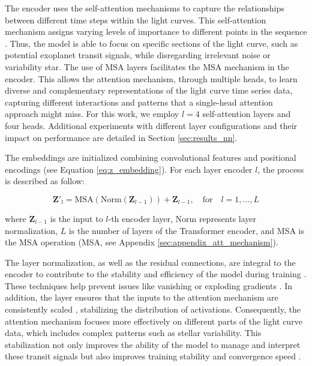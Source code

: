 The encoder uses the self-attention mechanisms to capture the relationships between different time steps within the light curves. This self-attention mechanism assigns varying levels of importance to different points in the sequence \citep{vaswani2017attention}. Thus, the model is able to focus on specific sections of the light curve, such as potential exoplanet transit signals, while disregarding irrelevant noise or variability star. The use of MSA layers facilitates the MSA mechanism in the encoder. This allows the attention mechanism, through multiple heads, to learn diverse and complementary representations of the light curve time series data, capturing different interactions and patterns that a single-head attention approach might miss. For this work, we employ $l=4$ self-attention layers and four heads. Additional experiments with different layer configurations and their impact on performance are detailed in Section \ref{sec:results_nn}.\par

The embeddings are initialized combining convolutional features and positional encodings (see Equation \ref{eq:z_embedding}). For each layer encoder $l$, the process is described as follow:

\begin{equation}
\mathbf{Z'}_{l} = \mathrm{MSA}({\mathrm{Norm}(\mathbf{Z}_{l-1})}) + {\mathbf{Z}_{l-1}}, \quad \mathrm{for} \quad l=1,..., L
\end{equation}

where $\mathbf{Z}_{l-1}$ is the input to $l$-th encoder layer, $\mathrm{Norm}$ represents layer normalization, $L$ is the number of layers of the Transformer encoder, and MSA is the MSA operation (MSA, see Appendix \ref{sec:appendix_att_mechanism}). \par


The layer normalization, as well as the residual connections, are integral to the encoder to contribute to the stability and efficiency of the model during training \citep{wang2019learning}. These techniques help prevent issues like vanishing or exploding gradients \citep{ba2016using}. In addition, the layer ensures that the inputs to the attention mechanism are consistently scaled \citep{dosovitskiy2020image}, stabilizing the distribution of activations. Consequently, the attention mechanism focuses more effectively on different parts of the light curve data, which includes complex patterns such as stellar variability. This stabilization not only improves the ability of the model to manage and interpret these transit signals but also improves training stability and convergence speed \citep{wang2019learning}. \par


